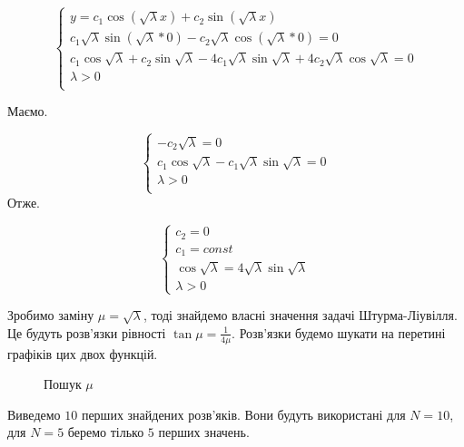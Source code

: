 \documentclass[14pt,a4paper]{scrartcl}
\begin{document}
	\begin{equation}\label{eq13}
		\begin{cases}
			y = c_1\cos(\sqrt{\lambda}x) + c_2\sin(\sqrt{\lambda} x)\\
			c_1\sqrt{\lambda}\sin(\sqrt{\lambda}*0)-c_2\sqrt{\lambda}\cos(\sqrt{\lambda}*0)=0\\
			c_1\cos\sqrt{\lambda} +c_2 \sin\sqrt{\lambda} - 4c_1\sqrt{\lambda}\sin\sqrt{\lambda}+4c_2\sqrt{\lambda}\cos\sqrt{\lambda}=0 \\
			\lambda>0\\
			\end{cases}
		\end{equation}
	
	Маємо.
	
	\begin{equation}\label{eq14}
		\begin{cases}
			-c_2\sqrt{\lambda} =0 \\
			c_1\cos\sqrt{\lambda} - c_1\sqrt{\lambda}\sin\sqrt{\lambda} =0\\
			\lambda >0\\
		\end{cases}
	\end{equation}
	Отже.
	
	\begin{equation}\label{eq15}
		\begin{cases}
		c_2 =0\\
		c_1 = const \\
		\cos\sqrt{\lambda} = 4\sqrt{\lambda}\sin\sqrt{\lambda}\\
		\lambda >0
		\end{cases}
	\end{equation}
	
	Зробимо заміну $\mu = \sqrt{\lambda}$, тоді знайдемо власні значення задачі Штурма-Ліувілля. Це будуть розв'язки рівності $\tan\mu = \frac{1}{4\mu}$. Розв'язки будемо шукати на перетині графіків цих двох функцій.
	
	\begin{figure}[h]
		\caption{Пошук $\mu$}
		\label{fig:image}
	\end{figure}
	
	Виведемо $10$ перших знайдених розв'яків. Вони будуть використані для $N=10$, для $N=5$ беремо тілько $5$ перших значень.
	
	
\end{document}
